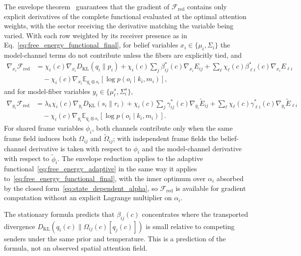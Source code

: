 The envelope theorem~\cite{MilgromSegal2002} guarantees that the gradient of $\mathcal{F}_{\mathrm{red}}$ contains only explicit derivatives of the complete functional evaluated at the optimal attention weights, with the sector receiving the derivative matching the variable being varied. With each row weighted by its receiver presence as in Eq.~\eqref{eq:free_energy_functional_final}, for belief variables $x_i \in \{\mu_i,\Sigma_i\}$ the model-channel terms do not contribute unless the fibers are explicitly tied, and
\begin{equation}
\begin{aligned}
\nabla_{x_i}\mathcal{F}_{\mathrm{red}}
&= \chi_i(c)\nabla_{x_i}D_{\mathrm{KL}}(q_i\|p_i)
+ \chi_i(c)\sum_j \beta^*_{ij}(c)\nabla_{x_i}E_{ij}
+ \sum_\ell \chi_\ell(c)\beta^*_{\ell i}(c)\nabla_{x_i}E_{\ell i} \\
&\quad - \chi_i(c)\nabla_{x_i}\mathbb{E}_{q_i\otimes s_i}[\log p(o_i\mid k_i,m_i)],
\end{aligned}
\label{eq:envelope_gradient_belief}
\end{equation}
and for model-fiber variables $y_i \in \{\mu^s_i,\Sigma^s_i\}$,
\begin{equation}
\begin{aligned}
\nabla_{y_i}\mathcal{F}_{\mathrm{red}}
&= \lambda_h\chi_i(c)\nabla_{y_i}D_{\mathrm{KL}}(s_i\|r_i)
+ \chi_i(c)\sum_j \gamma^*_{ij}(c)\nabla_{y_i}\tilde E_{ij}
+ \sum_\ell \chi_\ell(c)\gamma^*_{\ell i}(c)\nabla_{y_i}\tilde E_{\ell i} \\
&\quad - \chi_i(c)\nabla_{y_i}\mathbb{E}_{q_i\otimes s_i}[\log p(o_i\mid k_i,m_i)].
\end{aligned}
\label{eq:envelope_gradient_model}
\end{equation}
For shared frame variables $\phi_i$, both channels contribute only when the same frame field induces both $\Omega_{ij}$ and $\tilde{\Omega}_{ij}$; with independent frame fields the belief-channel derivative is taken with respect to $\phi_i$ and the model-channel derivative with respect to $\tilde{\phi}_i$. The envelope reduction applies to the adaptive functional~\eqref{eq:free_energy_adaptive} in the same way it applies to~\eqref{eq:free_energy_functional_final}, with the inner optimum over $\alpha_i$ absorbed by the closed form~\eqref{eq:state_dependent_alpha}, so $\mathcal{F}_{\mathrm{red}}$ is available for gradient computation without an explicit Lagrange multiplier on $\alpha_i$.

The stationary formula predicts that $\beta_{ij}(c)$ concentrates where the transported divergence $D_{\mathrm{KL}}(q_i(c)\|\Omega_{ij}(c)[q_j(c)])$ is small relative to competing senders under the same prior and temperature. This is a prediction of the formula, not an observed spatial attention field.

